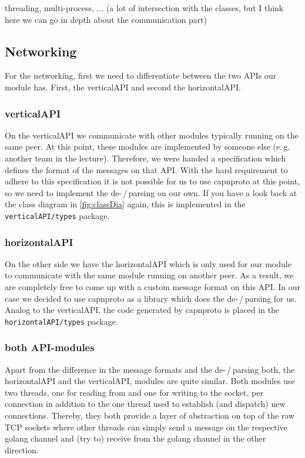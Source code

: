 \documentclass[a4paper,english,10pt,NET]{tumarticle}
\renewcommand{\eg}{\mbox{e.\,g.}\xspace} %
\begin{document}
threading, multi-process, ... (a lot of intersection with the classes, but I think here we can go in depth about the communication part)

\subsection{Networking} \label{sec:structureNetworking}

For the networking, first we need to differentiate between the two APIs our module has.
First, the verticalAPI and second the horizontalAPI.

\subsubsection{verticalAPI}
On the verticalAPI we communicate with other modules typically running on the same peer.
At this point, these modules are implemented by someone else (\eg another team in the lecture).
Therefore, we were handed a specification which defines the format of the messages on that API.
With the hard requirement to adhere to this specification it is not possible for us to use capnproto at this point, so we need to implement the de-\,/\,parsing on our own.
If you have a look back at the class diagram in \cref{fig:classDia} again, this is implemented in the \texttt{verticalAPI/types} package.

\subsubsection{horizontalAPI}
On the other side we have the horizontalAPI which is only used for our module to communicate with the same module running on another peer.
As a result, we are completely free to come up with a custom message format on this API.
In our case we decided to use capnproto as a library which does the de-\,/\,parsing for us.
Analog to the verticalAPI, the code generated by capnproto is placed in the \texttt{horizontalAPI/types} package.

\subsubsection{both API-modules}
Apart from the difference in the message formats and the de-\,/\,parsing both, the horizontalAPI and the verticalAPI, modules are quite similar.
Both modules use two threads, one for reading from and one for writing to the socket, per connection in addition to the one thread used to establish (and dispatch) new connections.
Thereby, they both provide a layer of abstraction on top of the raw TCP sockets where other threads can simply send a message on the respective golang channel and (try to) receive from the golang channel in the other direction.
\end{document}
